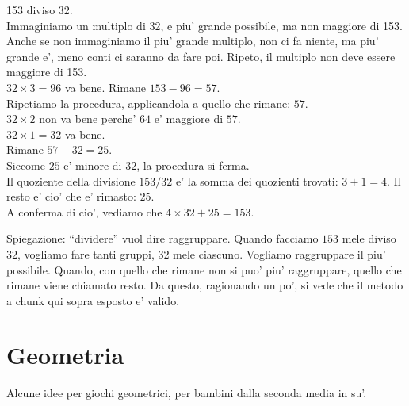 \documentclass[a4paper]{article}
\begin{document}
\begin{exemp}
	153 diviso 32.\\
	Immaginiamo un multiplo di 32, e piu' grande possibile, ma non maggiore di 153. Anche se non immaginiamo il piu' grande multiplo, non ci fa niente, ma piu' grande e', meno conti ci saranno da fare poi. Ripeto, il multiplo non deve essere maggiore di 153.\\
	$32\times 3 = 96$ va bene.
	Rimane $153 - 96 = 57$.\\
	Ripetiamo la procedura, applicandola a quello che rimane: $57$.\\
	$32 \times 2$ non va bene perche' $64$ e' maggiore di $57$.\\
	$32 \times 1 = 32$ va bene.\\
	Rimane $57-32=25$.\\
	Siccome $25$ e' minore di $32$, la procedura si ferma.\\
	Il quoziente della divisione $153 / 32$ e' la somma dei quozienti trovati: $3+1=4$. Il resto e' cio' che e' rimasto: $25$.\\
	A conferma di cio', vediamo che $4\times 32 + 25 = 153$.	
\end{exemp}

Spiegazione: ``dividere'' vuol dire raggruppare. Quando facciamo $153$ mele diviso $32$, vogliamo fare tanti gruppi, 32 mele ciascuno. Vogliamo raggruppare il piu' possibile. Quando, con quello che rimane non si puo' piu' raggruppare, quello che rimane viene chiamato resto. Da questo, ragionando un po', si vede che il metodo a chunk qui sopra esposto e' valido.

\section{Geometria}

Alcune idee per giochi geometrici, per bambini dalla seconda media in su'.
\end{document}
